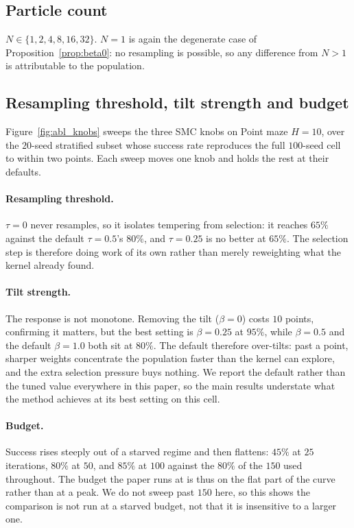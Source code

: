 \subsection{Particle count}
\tbd{} $N\in\{1,2,4,8,16,32\}$. $N{=}1$ is again the degenerate case of
Proposition~\ref{prop:beta0}: no resampling is possible, so any difference from
$N{>}1$ is attributable to the population.

\subsection{Resampling threshold, tilt strength and budget}
\label{app:knobs}

Figure~\ref{fig:abl_knobs} sweeps the three SMC knobs on Point maze $H{=}10$,
over the $20$-seed stratified subset whose success rate reproduces the full
$100$-seed cell to within two points. Each sweep moves one knob and holds the
rest at their defaults.

\paragraph{Resampling threshold.} $\tau{=}0$ never resamples, so it isolates
tempering from selection: it reaches $65\%$ against the default $\tau{=}0.5$'s
$80\%$, and $\tau{=}0.25$ is no better at $65\%$. The selection step is
therefore doing work of its own rather than merely reweighting what the kernel
already found.

\paragraph{Tilt strength.} The response is not monotone. Removing the tilt
($\beta{=}0$) costs $10$ points, confirming it matters, but the best setting is
$\beta{=}0.25$ at $95\%$, while $\beta{=}0.5$ and the default $\beta{=}1.0$ both
sit at $80\%$. The default therefore over-tilts: past a point, sharper weights
concentrate the population faster than the kernel can explore, and the extra
selection pressure buys nothing. We report the default rather than the tuned
value everywhere in this paper, so the main results understate what the method
achieves at its best setting on this cell.

\paragraph{Budget.} Success rises steeply out of a starved regime and then
flattens: $45\%$ at $25$ iterations, $80\%$ at $50$, and $85\%$ at $100$ against
the $80\%$ of the $150$ used throughout. The budget the paper runs at is thus on
the flat part of the curve rather than at a peak. We do not sweep past $150$
here, so this shows the comparison is not run at a starved budget, not that it
is insensitive to a larger one.

